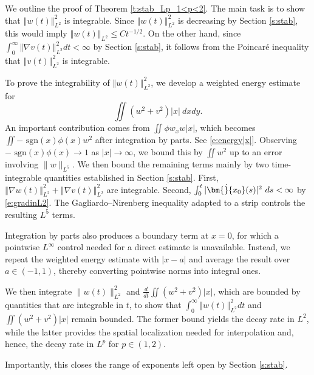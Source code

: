 \documentclass[final,11pt]{article}
\renewcommand{\leq}{\leqslant}
\theoremstyle{definition} %
\newcommand{\lv}{\left\Vert}
\newcommand{\rv}{\right\Vert}
\newcommand{\sgn}{\textrm{ sgn}}
\theoremstyle{plain}
\theoremstyle{definition} %
\theoremstyle{remark}
\begin{document}
We outline the proof of Theorem \ref{t:stab_Lp_1<p<2}. The main task is to show that $\lv w(t)\rv_{L^2}^2$ is integrable. Since $\lv w(t)\rv_{L^2}^2$ is decreasing by Section \ref{s:stab}, this would imply $\lv w(t)\rv_{L^2}\leq Ct^{-1/2}$. On the other hand, since $\int_0^\infty\lv \nabla v(t) \rv_{L^2}^2dt < \infty$ by Section \ref{s:stab}, it follows from the Poincar{\'e} inequality that $\lv v(t)\rv_{L^2}^2$ is integrable.

To prove the integrability of $\lv w(t)\rv_{L^2}^2$, we develop a weighted energy estimate for 
\[
\iint(w^2+v^2)|x|~dxdy.
\]
An important contribution comes from $\iint \phi w_xw|x|$, which becomes $\iint-\sgn(x)\phi(x)w^2$ after integration by parts. See \eqref{e:energy|x|}. Observing $-\sgn(x)\phi(x)\to1$ as $|x|\to\infty$, we bound this by $\iint w^2$ up to an error involving $\|w\|_{L^5}$. We then bound the remaining terms mainly by two time-integrable quantities established in Section \ref{s:stab}. First, $\lv\nabla w(t)\rv_{L^2}^2+\lv\nabla v(t)\rv_{L^2}^2$ are integrable.  Second, $\int_0^t|\bm{\dot}{x_0}(s)|^2~ds<\infty$ by \eqref{e:gradinL2}. The Gagliardo--Nirenberg inequality adapted to a strip controls the resulting $L^5$ terms.

Integration by parts also produces a boundary term at $x=0$, for which a pointwise $L^\infty$ control needed for a direct estimate is unavailable. Instead, we repeat the weighted energy estimate with $|x-a|$ and average the result over $a\in(-1,1)$, thereby converting pointwise norms into integral ones.

We then integrate $\|w(t)\|_{L^2}^2$ and $\frac{d}{dt}\iint (w^2 + v^2)|x| $, which are bounded by quantities that are integrable in $t$, to show that $\int_0^\infty\lv w(t)\rv_{L^2}^2dt$ and $\iint(w^2+v^2)|x|$ remain bounded. The former bound yields the decay rate in $L^2$, while the latter provides the spatial localization needed for interpolation and, hence, the decay rate in $L^p$ for $p\in(1,2)$. 

Importantly, this closes the range of exponents left open by Section \ref{s:stab}.

\newpage 
\end{document}
